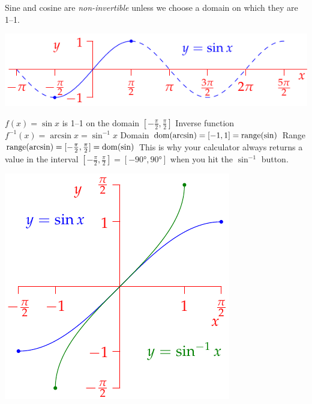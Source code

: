Sine and cosine are \emph{non-invertible} unless we choose a domain on which they are 1--1.\par
\begin{minipage}[t]{0.6\textwidth}\vspace{-3pt}
	\includegraphics[scale=0.95]{invsine2}\par
	$f(x)=\sin x$ is 1--1 on the domain $[-\frac\pi 2,\frac\pi 2]$\smallbreak
	Inverse function $f^{-1}(x)=\arcsin x=\sin^{-1}x$\smallbreak
	Domain $\operatorname{dom}(\arcsin)=[-1,1] =\operatorname{range}(\sin)$\smallbreak
	Range $\operatorname{range}(\arcsin)=[-\frac\pi 2,\frac\pi 2]=\operatorname{dom}(\sin)$\medbreak
	This is why your calculator always returns a value in the interval $[-\frac\pi 2,\frac\pi 2]=[-\ang{90},\ang{90}]$ when you hit the $\sin^{-1}$ button.
\end{minipage}
\hfill
\begin{minipage}[t]{0.39\textwidth}\vspace{-5pt}
	\flushright\includegraphics[scale=0.9]{invsine}
\end{minipage}


